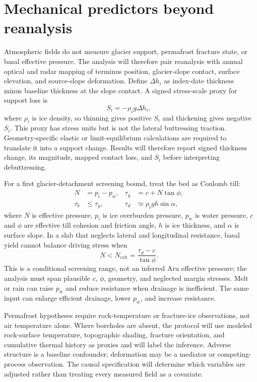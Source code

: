 \documentclass[11pt]{article}
\begin{document}
\section{Mechanical predictors beyond reanalysis}

Atmospheric fields do not measure glacier support, permafrost fracture state,
or basal effective pressure. The analysis will therefore pair reanalysis with
annual optical and radar mapping of terminus position, glacier-slope contact,
surface elevation, and source-slope deformation. Define $\Delta h_i$ as
index-date thickness minus baseline thickness at the slope contact. A signed
stress-scale proxy for support loss is
\begin{equation}
  S_i = -\rho_i g\Delta h_i,
\end{equation}
where $\rho_i$ is ice density, so thinning gives positive $S_i$ and thickening
gives negative $S_i$. This proxy has stress units but is not the lateral
buttressing traction. Geometry-specific elastic or limit-equilibrium
calculations are required to translate it into a support change. Results will
therefore report signed thickness change, its magnitude, mapped contact loss,
and $S_i$ before interpreting debuttressing.

For a first glacier-detachment screening bound, treat the bed as Coulomb till:
\begin{equation}
\begin{aligned}
  N &= p_i-p_w, & \tau_y &= c + N\tan\phi, \\
  \tau_b &\leq \tau_y, & \tau_d &\simeq \rho_i g h\sin\alpha,
\end{aligned}
\end{equation}
where $N$ is effective pressure, $p_i$ is ice overburden pressure, $p_w$ is
water pressure, $c$ and $\phi$ are effective till cohesion and friction angle,
$h$ is ice thickness, and $\alpha$ is surface slope. In a slab that neglects
lateral and longitudinal resistance, basal yield cannot balance driving stress
when
\begin{equation}
  N < N_{\mathrm{crit}} = \frac{\tau_d-c}{\tan\phi}.
\end{equation}
This is a conditional screening range, not an inferred Aru effective pressure;
the analysis must span plausible $c$, $\phi$, geometry, and neglected margin
stresses. Melt or rain can raise $p_w$ and reduce resistance when drainage is
inefficient. The same input can enlarge efficient drainage, lower $p_w$, and
increase resistance.

Permafrost hypotheses require rock-temperature or fracture-ice observations,
not air temperature alone. Where boreholes are absent, the protocol will use
modeled rock-surface temperature, topographic shading, fracture orientation,
and cumulative thermal history as proxies and will label the inference.
Adverse structure is a baseline confounder; deformation may be a mediator or
competing-process observation. The causal specification will determine which
variables are adjusted rather than treating every measured field as a
covariate.
\end{document}
